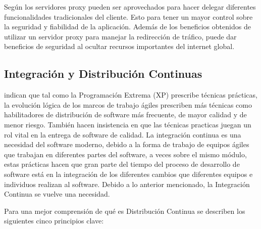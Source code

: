 Según \cite{agyekum2021proxy} los servidores proxy pueden ser aprovechados para hacer delegar
diferentes funcionalidades tradicionales del cliente.
Esto para tener un mayor control sobre la seguridad y fiabilidad de la aplicación.
Además de los beneficios obtenidos de utilizar un servidor proxy para manejar la redirección
de tráfico, puede dar beneficios de seguridad al ocultar recursos importantes del internet global.

\subsection{Integración y Distribución Continuas}

\cite{humble2018accelerate} indican que tal como la Programación Extrema (XP) prescribe técnicas prácticas,
la evolución lógica de los marcos de trabajo ágiles prescriben más técnicas como habilitadores de
distribución de software más frecuente, de mayor calidad y de menor riesgo.
También hacen insistencia en que las técnicas practicas juegan un rol vital en la entrega de software de calidad.
La integración continua es una necesidad del software moderno, debido a la forma de trabajo de equipos
ágiles que trabajan en diferentes partes del software, a veces sobre el mismo módulo, estas prácticas
hacen que gran parte del tiempo del proceso de desarrollo de software está en la integración
de los diferentes cambios que diferentes equipos e individuos realizan al software.
Debido a lo anterior mencionado, la Integración Continua se vuelve una necesidad.

Para una mejor comprensión de qué es Distribución Continua se describen los siguientes cinco principios clave:

